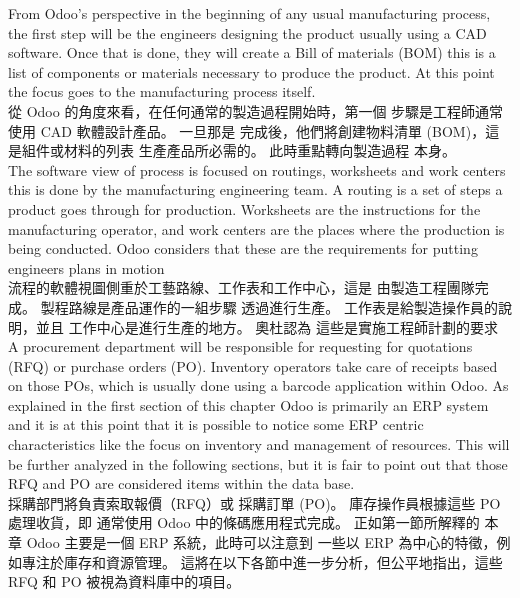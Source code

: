 \fontsize{12}{2.5pt}\sectionef 
 {From Odoo’s perspective in the beginning of any usual manufacturing process, the first
step will be the engineers designing the product usually using a CAD software. Once that is
done, they will create a Bill of materials (BOM) this is a list of components or materials
necessary to produce the product. At this point the focus goes to the manufacturing process
itself.}\\[1pt]

\fontsize{12}{2.5pt}\sectionef  
{從 Odoo 的角度來看，在任何通常的製造過程開始時，第一個
步驟是工程師通常使用 CAD 軟體設計產品。 一旦那是
完成後，他們將創建物料清單 (BOM)，這是組件或材料的列表
生產產品所必需的。 此時重點轉向製造過程
本身。}
\\[15pt]

\fontsize{12}{2.5pt}\sectionef 
 {The software view of process is focused on routings, worksheets and work centers this is
done by the manufacturing engineering team. A routing is a set of steps a product goes
through for production. Worksheets are the instructions for the manufacturing operator, and
work centers are the places where the production is being conducted. Odoo considers that
these are the requirements for putting engineers plans in motion}\\[1pt]

\fontsize{12}{2.5pt}\sectionef  
{流程的軟體視圖側重於工藝路線、工作表和工作中心，這是
由製造工程團隊完成。 製程路線是產品運作的一組步驟
透過進行生產。 工作表是給製造操作員的說明，並且
工作中心是進行生產的地方。 奧杜認為
這些是實施工程師計劃的要求}
\\[15pt]

\fontsize{12}{2.5pt}\sectionef 
 {A procurement department will be responsible for requesting for quotations (RFQ) or
purchase orders (PO). Inventory operators take care of receipts based on those POs, which is
usually done using a barcode application within Odoo. As explained in the first section of
this chapter Odoo is primarily an ERP system and it is at this point that it is possible to notice
some ERP centric characteristics like the focus on inventory and management of resources.
This will be further analyzed in the following sections, but it is fair to point out that those
RFQ and PO are considered items within the data base.}\\[1pt]

\fontsize{12}{2.5pt}\sectionef  
{採購部門將負責索取報價（RFQ）或
採購訂單 (PO)。 庫存操作員根據這些 PO 處理收貨，即
通常使用 Odoo 中的條碼應用程式完成。 正如第一節所解釋的
本章 Odoo 主要是一個 ERP 系統，此時可以注意到
一些以 ERP 為中心的特徵，例如專注於庫存和資源管理。
這將在以下各節中進一步分析，但公平地指出，這些
RFQ 和 PO 被視為資料庫中的項目。}
\\[15pt]

